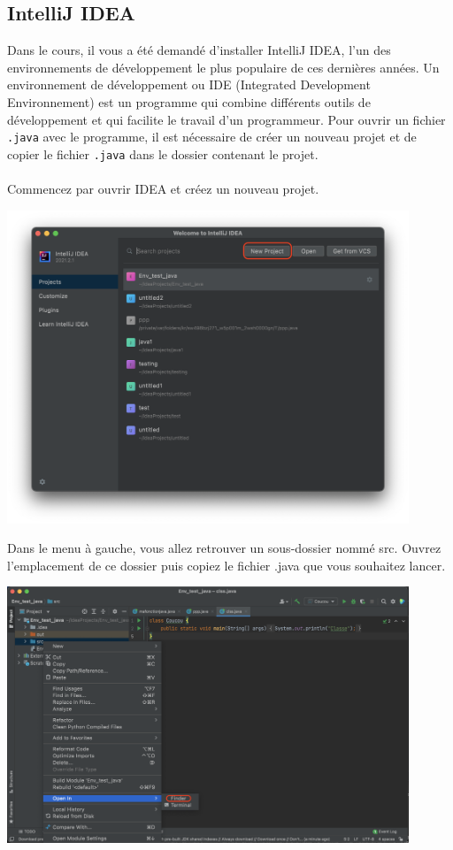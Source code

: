 \subsection{IntelliJ IDEA}

Dans le cours, il vous a été demandé d'installer IntelliJ IDEA, l'un des environnements de développement le plus populaire de ces dernières années. Un environnement de développement ou IDE (Integrated Development Environnement) est un programme qui combine différents outils de développement et qui facilite le travail d'un programmeur. Pour ouvrir un fichier \lstinline{.java} avec le programme, il est nécessaire de créer un nouveau projet et de copier le fichier \lstinline{.java} dans le dossier contenant le projet.
\\\\
Commencez par ouvrir IDEA et créez un nouveau projet.

\begin{center}
	\includegraphics[width=12cm]{np}	
\end{center}
 

Dans le menu à gauche, vous allez retrouver un sous-dossier nommé src. Ouvrez l'emplacement de ce dossier puis copiez le fichier .java que vous souhaitez lancer.

\begin{center}
	\includegraphics[width=12cm]{finder}	
\end{center}

